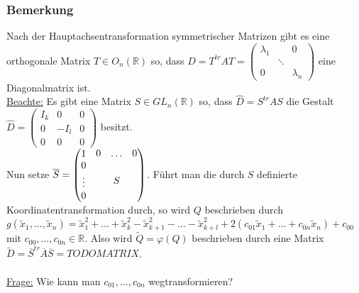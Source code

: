 \documentclass[a4paper]{article}
\newcommand{\ul}{\underline}
\let\phi\varphi
\begin{document}
\subsubsection{Bemerkung}
Nach der Hauptachsentransformation symmetrischer Matrizen gibt es eine orthogonale Matrix \(T\in O_n(\mathbb{R})\) so, dass \(D=T^{tr}AT=\begin{pmatrix}
\lambda_1 & & 0\\
& \ddots & \\
0 & & \lambda_n
\end{pmatrix}\) eine Diagonalmatrix ist.\\
\ul{Beachte:} Es gibt eine Matrix \(S\in GL_n(\mathbb{R})\) so, dass \(\hat{D}=S^{tr}AS\) die Gestalt \(\hat{D}=\begin{pmatrix}
I_k & 0 & 0\\
0 & -I_l & 0\\
0 & 0 & 0
\end{pmatrix}\) besitzt.\\
Nun setze \(\overline{S}=\begin{pmatrix}
1 & \begin{matrix}0 & \hdots & 0\end{matrix}\\
\begin{matrix}
0\\
\vdots\\
0
\end{matrix} & \Huge S
\end{pmatrix}\). Führt man die durch \(S\) definierte Koordinatentransformation durch, so wird \(Q\) beschrieben durch \(g(\tilde{x}_1,\dots,\tilde{x}_n)=\tilde{x}_1^2+\dots+\tilde{x}_k^2-\tilde{x}_{k+1}^2-\dots-\tilde{x}_{k+l}^2+2(c_{01}\tilde{x}_1+\dots+c_{0n}\tilde{x}_n)+c_{00}\) mit \(c_{00},\dots,c_{0n}\in\mathbb{R}\). Also wird \(\tilde{Q}=\phi(Q)\) beschrieben durch eine Matrix \(\tilde{D}=\overline{S}^{tr}\overline{A}\overline{S}=TODO MATRIX\).\\\\
\ul{Frage:} Wie kann man \(c_{01},\dots,c_{0n}\) wegtransformieren?
\end{document}
